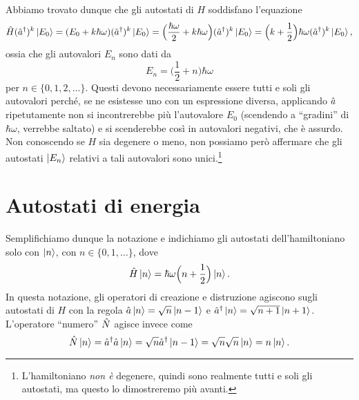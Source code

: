 Abbiamo trovato dunque che gli autostati di $H$ soddisfano l'equazione
\begin{equation}
	\hat{H}({\hat{a}}^\dagger)^k\left|{E_0}\right\rangle=(E_0+k\hbar\omega)({\hat{a}}^\dagger)^k\left|{E_0}\right\rangle=\Big(\frac{\hbar\omega}2+k\hbar\omega\Big)({\hat{a}}^\dagger)^k\left|{E_0}\right\rangle=\Big(k+\frac12\Big)\hbar\omega({\hat{a}}^\dagger)^k\left|{E_0}\right\rangle,
\end{equation}
ossia che gli autovalori $E_n$ sono dati da
\begin{equation}
	E_n=\Big(\frac12+n\Big)\hbar\omega
	\label{eq:oscillatore-armonico-autovalori-hamiltoniano}
\end{equation}
per $n\in\{0,1,2,\dots\}$.
Questi devono necessariamente essere tutti e soli gli autovalori perch\'e, se ne esistesse uno con un espressione diversa, applicando $\hat{a}$ ripetutamente non si incontrerebbe più l'autovalore $E_0$ (scendendo a ``gradini'' di $\hbar\omega$, verrebbe saltato) e si scenderebbe cos\`i in autovalori negativi, che è assurdo.
Non conoscendo se $H$ sia degenere o meno, non possiamo però affermare che gli autostati $\left|{E_n}\right\rangle$ relativi a tali autovalori sono unici.\footnote{L'hamiltoniano \emph{non è} degenere, quindi sono realmente tutti e soli gli autostati, ma questo lo dimostreremo più avanti.}

\section{Autostati di energia}
Semplifichiamo dunque la notazione e indichiamo gli autostati dell'hamiltoniano solo con $\left|{n}\right\rangle$, con $n\in\{0,1,\dots\}$, dove 
\begin{equation}
	\hat{H}\left|{n}\right\rangle=\hbar\omega\Big(n+\frac12\Big)\left|{n}\right\rangle.
\end{equation}
In questa notazione, gli operatori di creazione e distruzione agiscono sugli autostati di $H$ con la regola $\hat{a}\left|{n}\right\rangle=\sqrt{n}\left|{n-1}\right\rangle$ e ${\hat{a}}^\dagger\left|{n}\right\rangle=\sqrt{n+1}\left|{n+1}\right\rangle$.
L'operatore ``numero'' $\hat{N}$ agisce invece come
\begin{equation}
	\hat{N}\left|{n}\right\rangle={\hat{a}}^\dagger\hat{a}\left|{n}\right\rangle=\sqrt{n}{\hat{a}}^\dagger\left|{n-1}\right\rangle=\sqrt{n}\sqrt{n}\left|{n}\right\rangle=n\left|{n}\right\rangle.
	\label{eq:oscillatore-armonico-operatore-numero}
\end{equation}

